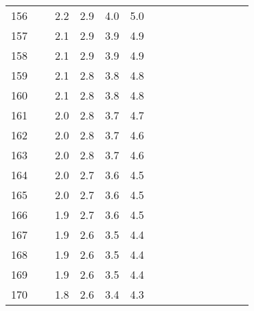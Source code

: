 \documentclass[]{article}
\begin{document}
\begin{table}
\begin{tabular}{l|lllllllllll}
    156      & ~   & 2.2 & 2.9 & 4.0  & 5.0  & ~ & ~   & ~   & ~     & ~   & ~   \\
    157      & ~   & 2.1 & 2.9 & 3.9  & 4.9  & ~ & ~   & ~   & ~     & ~   & ~   \\
    158      & ~   & 2.1 & 2.9 & 3.9  & 4.9  & ~ & ~   & ~   & ~     & ~   & ~   \\
    159      & ~   & 2.1 & 2.8 & 3.8  & 4.8  & ~ & ~   & ~   & ~     & ~   & ~   \\
    160      & ~   & 2.1 & 2.8 & 3.8  & 4.8  & ~ & ~   & ~   & ~     & ~   & ~   \\
    161      & ~   & 2.0 & 2.8 & 3.7  & 4.7  & ~ & ~   & ~   & ~     & ~   & ~   \\
    162      & ~   & 2.0 & 2.8 & 3.7  & 4.6  & ~ & ~   & ~   & ~     & ~   & ~   \\
    163      & ~   & 2.0 & 2.8 & 3.7  & 4.6  & ~ & ~   & ~   & ~     & ~   & ~   \\
    164      & ~   & 2.0 & 2.7 & 3.6  & 4.5  & ~ & ~   & ~   & ~     & ~   & ~   \\
    165      & ~   & 2.0 & 2.7 & 3.6  & 4.5  & ~ & ~   & ~   & ~     & ~   & ~   \\
    166      & ~   & 1.9 & 2.7 & 3.6  & 4.5  & ~ & ~   & ~   & ~     & ~   & ~   \\
    167      & ~   & 1.9 & 2.6 & 3.5  & 4.4  & ~ & ~   & ~   & ~     & ~   & ~   \\
    168      & ~   & 1.9 & 2.6 & 3.5  & 4.4  & ~ & ~   & ~   & ~     & ~   & ~   \\
    169      & ~   & 1.9 & 2.6 & 3.5  & 4.4  & ~ & ~   & ~   & ~     & ~   & ~   \\
    170      & ~   & 1.8 & 2.6 & 3.4  & 4.3  & ~ & ~   & ~   & ~     & ~   & ~   \\
    \end{tabular}
\end{table}
\newpage
\end{document}
